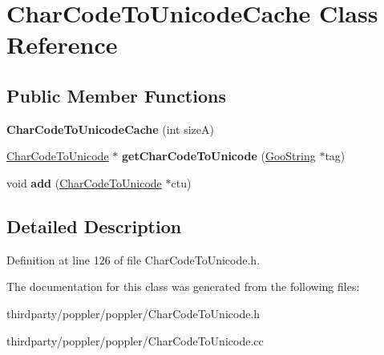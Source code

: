 \hypertarget{class_char_code_to_unicode_cache}{}\section{Char\+Code\+To\+Unicode\+Cache Class Reference}
\label{class_char_code_to_unicode_cache}
\subsection*{Public Member Functions}
\begin{DoxyCompactItemize}
\item 
\mbox{\label{class_char_code_to_unicode_cache_a4e2ced2f5b7941d645fd3ed249915727}} 
{\bfseries Char\+Code\+To\+Unicode\+Cache} (int sizeA)
\item 
\mbox{\label{class_char_code_to_unicode_cache_a9b9b43aa2be7e77321c515630c3f3494}} 
\hyperlink{class_char_code_to_unicode}{Char\+Code\+To\+Unicode} $\ast$ {\bfseries get\+Char\+Code\+To\+Unicode} (\hyperlink{class_goo_string}{Goo\+String} $\ast$tag)
\item 
\mbox{\label{class_char_code_to_unicode_cache_a79d8eba9e422808ab67ac036fcea6b41}} 
void {\bfseries add} (\hyperlink{class_char_code_to_unicode}{Char\+Code\+To\+Unicode} $\ast$ctu)
\end{DoxyCompactItemize}


\subsection{Detailed Description}


Definition at line 126 of file Char\+Code\+To\+Unicode.\+h.



The documentation for this class was generated from the following files\+:\begin{DoxyCompactItemize}
\item 
thirdparty/poppler/poppler/Char\+Code\+To\+Unicode.\+h\item 
thirdparty/poppler/poppler/Char\+Code\+To\+Unicode.\+cc\end{DoxyCompactItemize}
